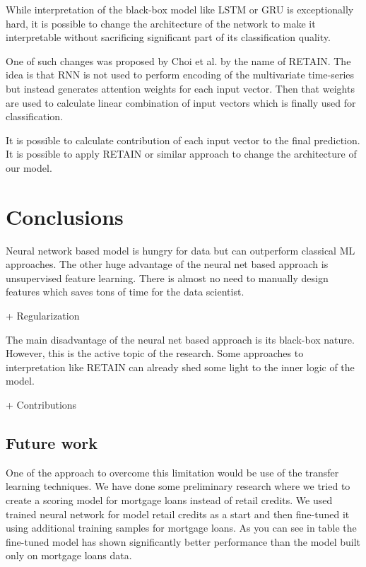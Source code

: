 \documentclass{sigkddExp}
\begin{document}
While interpretation of the black-box model like LSTM or GRU is exceptionally hard, it is possible to change the architecture of the network to make it interpretable without sacrificing significant part of its classification quality.

One of such changes was proposed by Choi et al.\cite{DBLP:journals/corr/ChoiBSSS16} by the name of RETAIN. The idea is that RNN is not used to perform encoding of the multivariate time-series but instead generates attention weights for each input vector. Then that weights are used to calculate linear combination of input vectors which is finally used for classification.

It is possible to calculate contribution of each input vector to the final prediction. It is possible to apply RETAIN or similar approach to change the architecture of our model.

\section{Conclusions}

Neural network based model is hungry for data but can outperform classical ML approaches. The other huge advantage of the neural net based approach is unsupervised feature learning. There is almost no need to manually design features which saves tons of time for the data scientist.

+ Regularization 

The main disadvantage of the neural net based approach is its black-box nature. However, this is the active topic of the research. Some approaches to interpretation like RETAIN can already shed some light to the inner logic of the model.

+ Contributions

\subsection{Future work}

One of the approach to overcome this limitation would be use of the transfer learning techniques. We have done some preliminary research where we tried to create a scoring model for mortgage loans instead of retail credits. We used trained neural network for model retail credits as a start and then fine-tuned it using additional training samples for mortgage loans. As you can see in table the fine-tuned model has shown significantly better performance than the model built only on mortgage loans data.



\end{document}

